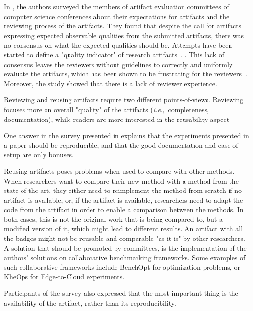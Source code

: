 \documentclass[sigconf,natbib=false]{acmart}
\newcommand{\ie}{\emph{i.e.,}}
\newcommand{\todo}[1]{{\color{red}{TODO: #1}}}
\begin{document}
In \cite{hermann2020community}, the authors surveyed the members of artifact evaluation committees of computer science conferences about their expectations for artifacts and the reviewing process of the artifacts. 
They found that despite the call for artifacts expressing expected observable qualities from the submitted artifacts, there was no consensus on what the expected qualities should be.
Attempts have been started to define a "quality indicator" of research artifacts\ \cite{castell2024towards}.
\todo{more}.
This lack of consensus leaves the reviewers without guidelines to correctly and uniformly evaluate the artifacts, which has been shown to be frustrating for the reviewers\ \cite{beller2020will}.
Moreover, the study showed that there is a lack of reviewer experience.

Reviewing and reusing artifacts require two different points-of-views.
Reviewing focuses more on overall "quality" of the artifacts (\ie\ completeness, documentation), while readers are more interested in the reusability aspect.

One answer in the survey presented in \cite{hermann2020community} explains that the experiments presented in a paper should be reproducible, and that the good documentation and ease of setup are only bonuses.

Reusing artifacts poses problems when used to compare with other methods.
When researchers want to compare their new method with a method from the state-of-the-art, they either need to reimplement the method from scratch if no artifact is available, or, if the artifact is available, researchers need to adapt the code from the artifact in order to enable a comparison between the methods.
In both cases, this is not the original work that is being compared to, but a modified version of it, which might lead to different results.
An artifact with all the badges might not be reusable and comparable "as it is" by other researchers.
A solution that should be promoted by committees, is the implementation of the authors' solutions on collaborative benchmarking frameworks.
Some examples of such collaborative frameworks include BenchOpt \cite{moreau2022benchopt} for optimization problems, or KheOps \cite{rosendo2023kheops} for Edge-to-Cloud experiments.



Participants of the survey also expressed that the most important thing is the availability of the artifact, rather than its reproducibility.
\end{document}
